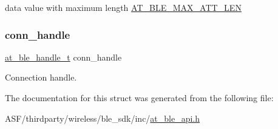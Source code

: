 data value with maximum length \mbox{\hyperlink{at__ble__api_8h_aef91d9f37b950f3551cde0f9f5b01c50}{A\+T\+\_\+\+B\+L\+E\+\_\+\+M\+A\+X\+\_\+\+A\+T\+T\+\_\+\+L\+EN}} 

\mbox{\label{structat__ble__indication__recieved__t_ae42df6fd8493f8f8faeccfdd6062e96f}} 
\subsubsection{\texorpdfstring{conn\_handle}{conn\_handle}}
{\footnotesize\ttfamily \mbox{\hyperlink{at__ble__api_8h_abd23646d0c662860741f787efc8456f2}{at\+\_\+ble\+\_\+handle\+\_\+t}} conn\+\_\+handle}



Connection handle. 



The documentation for this struct was generated from the following file\+:\begin{DoxyCompactItemize}
\item 
A\+S\+F/thirdparty/wireless/ble\+\_\+sdk/inc/\mbox{\hyperlink{at__ble__api_8h}{at\+\_\+ble\+\_\+api.\+h}}\end{DoxyCompactItemize}
